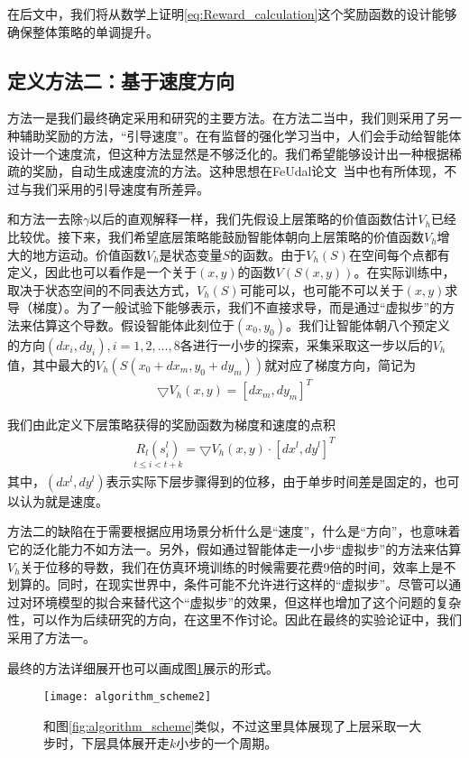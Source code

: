 在后文中，我们将从数学上证明\eqref{eq:Reward_calculation}这个奖励函数的设计能够确保整体策略的单调提升。

\subsection{定义方法二：基于速度方向}
方法一是我们最终确定采用和研究的主要方法。在方法二当中，我们则采用了另一种辅助奖励的方法，``引导速度''。在有监督的强化学习当中，人们会手动给智能体设计一个速度流，但这种方法显然是不够泛化的。我们希望能够设计出一种根据稀疏的奖励，自动生成速度流的方法。这种思想在FeUdal论文~\cite{feudal}当中也有所体现，不过与我们采用的引导速度有所差异。

和方法一去除$\gamma$以后的直观解释一样，我们先假设上层策略的价值函数估计$V_h$已经比较优。接下来，我们希望底层策略能鼓励智能体朝向上层策略的价值函数$V_h$增大的地方运动。价值函数$V_h$是状态变量$S$的函数。由于$V_h(S)$在空间每个点都有定义，因此也可以看作是一个关于$(x, y)$的函数$V(S(x, y))$。在实际训练中，取决于状态空间的不同表达方式，$V_h(S)$可能可以，也可能不可以关于$(x, y)$求导（梯度）。为了一般试验下能够表示，我们不直接求导，而是通过``虚拟步''的方法来估算这个导数。假设智能体此刻位于$(x_0, y_0)$。我们让智能体朝八个预定义的方向$(dx_i, dy_i), i = 1,2,...,8$各进行一小步的探索，采集采取这一步以后的$V_h$值，其中最大的$V_h(S(x_0 + dx_m, y_0 + dy_m))$就对应了梯度方向，简记为
\begin{align}
  \bigtriangledown V_h(x, y) = [dx_m, dy_m]^T
\end{align}

我们由此定义下层策略获得的奖励函数为梯度和速度的点积
\begin{align}
  	\underset{t\leq  i < t+k}{R_l(s_i^l)} = \bigtriangledown V_h(x, y) \cdot [dx^l, dy^l]^T
	\label{eq:Reward_calculation2}
\end{align}
其中，$(dx^l, dy^l)$表示实际下层步骤得到的位移，由于单步时间差是固定的，也可以认为就是速度。

方法二的缺陷在于需要根据应用场景分析什么是``速度''，什么是``方向''，也意味着它的泛化能力不如方法一。另外，假如通过智能体走一小步``虚拟步''的方法来估算$V_h$关于位移的导数，我们在仿真环境训练的时候需要花费9倍的时间，效率上是不划算的。同时，在现实世界中，条件可能不允许进行这样的``虚拟步''。尽管可以通过对环境模型的拟合来替代这个``虚拟步''的效果，但这样也增加了这个问题的复杂性，可以作为后续研究的方向，在这里不作讨论。因此在最终的实验论证中，我们采用了方法一。

最终的方法详细展开也可以画成图\ref{fig:algorithm_scheme2}展示的形式。
      \begin{figure}[h] %
        \centering
        \texttt{[image: algorithm\_scheme2]}
        \caption{和图\ref{fig:algorithm_scheme}类似，不过这里具体展现了上层采取一大步时，下层具体展开走$k$小步的一个周期。}
        \label{fig:algorithm_scheme2}
      \end{figure}

